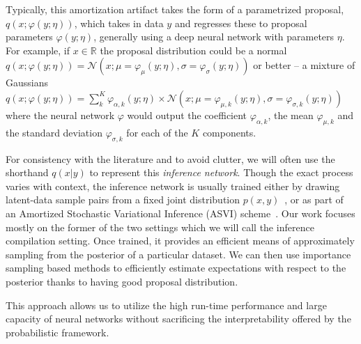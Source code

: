 \documentclass[12pt]{article}
\begin{document}
Typically, this amortization
artifact takes the form of a parametrized proposal, $q(x ; \varphi(y; \eta))$, which takes
in data $y$ and regresses these to proposal parameters $\varphi(y; \eta)$, generally using
a deep neural network with parameters $\eta$.
For example, if $x \in \mathbb{R}$ 
the proposal distribution could be a normal 
$q(x ; \varphi(y; \eta)) = \mathcal{N}(x;\mu=\varphi_{\mu}(y; \eta),\sigma=\varphi_{\sigma}(y; \eta))$
or better -- a mixture of Gaussians
$q(x ; \varphi(y; \eta)) = \sum_k^K \varphi_{\alpha,k}(y; \eta) \times \mathcal{N}(x;\mu=\varphi_{\mu,k}(y; \eta),\sigma=\varphi_{\sigma,k}(y; \eta))$
where the neural network $\varphi$ would output 
the coefficient $\varphi_{\alpha,k}$,
the mean $\varphi_{\mu,k}$ and
the standard deviation $\varphi_{\sigma,k}$
for each of the $K$ components.

For consistency with the literature and to avoid clutter, we will often
use the shorthand $q(x|y)$ to represent this \emph{inference network}.
Though the exact process varies with context,
the inference network is usually trained either by drawing latent-data
sample pairs from a fixed joint distribution
$p(x,y)$~\citep{ritchie2016deep,PaigeWood2016,LeEtAl2016}, or 
as part of an Amortized Stochastic Variational Inference (ASVI) scheme~\citep{HoffmanEtAl2013,VAE,RezendeEtAl2014}.
Our work focuses mostly on the former of the two settings which we will call the inference compilation setting.
Once trained, it provides an efficient means of approximately
sampling from the posterior of a particular dataset.
We can then use importance sampling based methods to efficiently estimate expectations
with respect to the posterior thanks to having good proposal distribution.

This approach allows us to utilize the high run-time performance and large capacity of neural networks 
without sacrificing the interpretability offered by the probabilistic framework.

% 
\end{document}

